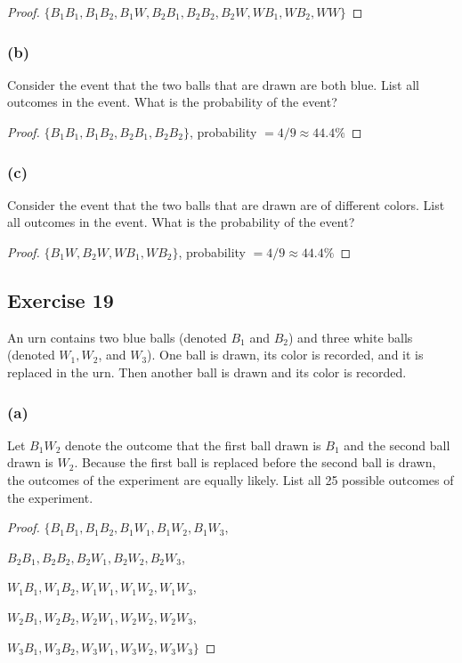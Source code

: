 \documentclass[14pt]{extarticle}
\begin{document}
\begin{proof}
     \(\{B_1B_1, B_1B_2, B_1W, B_2B_1, B_2B_2, B_2W, WB_1, WB_2, WW\}\)
\end{proof}

\subsubsection{(b)}
Consider the event that the two balls that are drawn are both blue. List all outcomes in the event.
What is the probability of the event?

\begin{proof}
     \(\{B_1B_1, B_1B_2, B_2B_1, B_2B_2\}\), probability \(= 4/9 \approx 44.4\%\)
\end{proof}

\subsubsection{(c)}
Consider the event that the two balls that are drawn are of different colors. List all outcomes in the event.
What is the probability of the event?

\begin{proof}
     \(\{B_1W, B_2W, WB_1, WB_2\}\), probability \(= 4/9 \approx 44.4\%\)
\end{proof}

\subsection{Exercise 19}
An urn contains two blue balls (denoted \(B_1\) and \(B_2\)) and three white balls (denoted \(W_1, W_2\), and
\(W_3\)). One ball is drawn, its color is recorded, and it is replaced in the urn. Then another ball is drawn and its
color is recorded.

\subsubsection{(a)}
Let \(B_1 W_2\) denote the outcome that the first ball drawn is \(B_1\) and the second ball drawn is \(W_2\).
Because the first ball is replaced before the second ball is drawn, the outcomes of the experiment are equally
likely. List all 25 possible outcomes of the experiment.

\begin{proof}
     \(\{B_1B_1, B_1B_2, B_1W_1, B_1W_2, B_1W_3\),

     \(B_2B_1, B_2B_2, B_2W_1, B_2W_2, B_2W_3\),

     \(W_1B_1, W_1B_2, W_1W_1, W_1W_2, W_1W_3\),

     \(W_2B_1, W_2B_2, W_2W_1, W_2W_2, W_2W_3\),

     \(W_3B_1, W_3B_2, W_3W_1, W_3W_2, W_3W_3\}\)
\end{proof}
\end{document}
